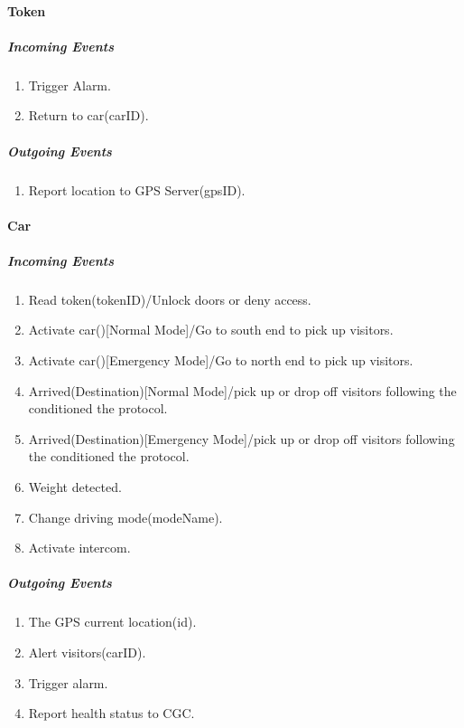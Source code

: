 \documentclass[12pt]{article}
\begin{document}
	\paragraph{Token}
	\textit{}
	    \subparagraph{Incoming Events}
		\begin{enumerate}
            \item Trigger Alarm. 
            \item Return to car(carID). 
		\end{enumerate}
				
	    \subparagraph{Outgoing Events}
		\begin{enumerate}
			\item Report location to GPS Server(gpsID).
		\end{enumerate}

	\paragraph{Car}
	\textit{}
	    \subparagraph{Incoming Events}
		\begin{enumerate}
            \item Read token(tokenID)/Unlock doors or deny access. 
            \item Activate car()[Normal Mode]/Go to south end to pick up visitors.
            \item Activate car()[Emergency Mode]/Go to north end to pick up visitors.
            \item Arrived(Destination)[Normal Mode]/pick up or drop off visitors following the conditioned the protocol.
            \item Arrived(Destination)[Emergency Mode]/pick up or drop off visitors following the conditioned the protocol.
            \item Weight detected.
            \item Change driving mode(modeName).
            \item Activate intercom.
		\end{enumerate}
				
	    \subparagraph{Outgoing Events}
		\begin{enumerate}
		    \item The GPS current location(id).
		    \item Alert visitors(carID).
		    \item Trigger alarm.
		    \item Report health status to CGC.
		\end{enumerate}
\end{document}
